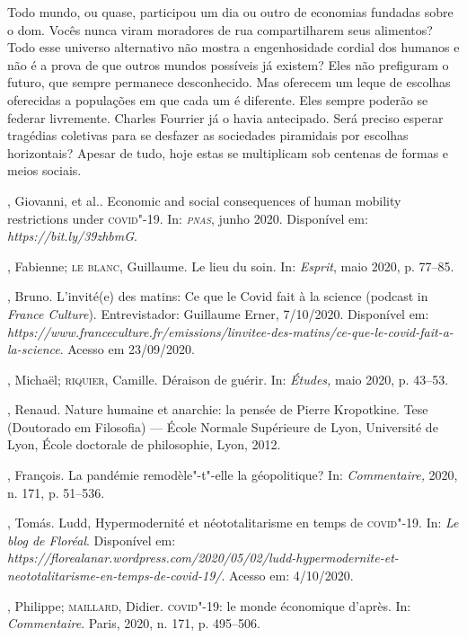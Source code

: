 Todo mundo, ou quase, participou um dia ou outro de economias fundadas
sobre o dom. Vocês nunca viram moradores de rua compartilharem seus
alimentos? Todo esse universo alternativo não mostra a engenhosidade
cordial dos humanos e não é a prova de que outros mundos possíveis já
existem? Eles não prefiguram o futuro, que sempre permanece
desconhecido. Mas oferecem um leque de escolhas oferecidas a populações
em que cada um é diferente. Eles sempre poderão se federar livremente.
Charles Fourrier já o havia antecipado. Será preciso esperar tragédias
coletivas para se desfazer as sociedades piramidais por escolhas
horizontais? Apesar de tudo, hoje estas se multiplicam sob centenas de
formas e meios sociais.


\begin{bibliohedra}
, Giovanni, et al.. Economic and social consequences of human
mobility restrictions under \textsc{covid}"-19. In: \emph{\textsc{pnas}}, junho 2020.
Disponível em: \emph{https://bit.ly/39zhbmG}.

, Fabienne; \textsc{le blanc}, Guillaume. Le lieu du soin. In:
\emph{Esprit}, maio 2020, p. 77--85.

, Bruno. L'invité(e) des matins: Ce que le Covid fait à la science
(podcast in \emph{France Culture}). Entrevistador: Guillaume Erner,
7/10/2020. Disponível em:
\emph{https://www.franceculture.fr/emissions/linvitee-des-matins/ce-que-le-covid-fait-a-la-science}.
Acesso em 23/09/2020.

, Michaël; \textsc{riquier}, Camille. Déraison de guérir. In:
\emph{Études,} maio 2020, p. 43--53.

, Renaud. Nature humaine et anarchie: la pensée de Pierre
Kropotkine. Tese (Doutorado em Filosofia) --- École Normale Supérieure
de Lyon, Université de Lyon, École doctorale de philosophie, Lyon, 2012.

, François. La pandémie remodèle"-t"-elle la géopolitique? In:
\emph{Commentaire,} 2020, n. 171, p. 51--536.

, Tomás. Ludd, Hypermodernité et néototalitarisme en temps de
\textsc{covid}"-19. In: \emph{Le blog de Floréal}. Disponível em:
\emph{https://florealanar.wordpress.com/2020/05/02/ludd-hypermodernite-et-neototalitarisme-en-temps-de-covid-19/}.
Acesso em: 4/10/2020.

, Philippe; \textsc{maillard}, Didier. \textsc{covid}"-19: le monde économique
d'après. In: \emph{Commentaire}. Paris, 2020, n. 171, p. 495--506.


\end{bibliohedra}

